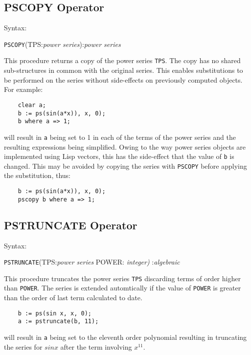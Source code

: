 \subsection{PSCOPY Operator}

Syntax:

\hspace*{2em} {\tt PSCOPY}(TPS:{\em power series}):{\em power series}

This procedure returns a copy of the power series {\tt TPS}. The copy
has no shared sub-structures in common with the original series.  This
enables substitutions to be performed on the series without
side-effects on previously computed objects. For example:

\begin{verbatim}
    clear a;
    b := ps(sin(a*x)), x, 0);
    b where a => 1;
\end{verbatim}

will result in {\tt a} being set to 1 in each of the terms of the
power series and the resulting expressions being simplified. Owing to
the way power series objects are implemented using Lisp vectors, this
has the side-effect that the value of {\tt b} is changed.  This may be
avoided by copying the series with {\tt PSCOPY} before applying the
substitution, thus:

\begin{verbatim}
    b := ps(sin(a*x)), x, 0);
    pscopy b where a => 1;
\end{verbatim}

\subsection{PSTRUNCATE Operator}

Syntax:

\hspace*{2em} {\tt PSTRUNCATE}(TPS:{\em power series} POWER: {\em integer)}
:{\em algebraic}

This procedure truncates the power series {\tt TPS} discarding terms
of order higher than {\tt POWER}. The series is extended automtically
if the value of {\tt POWER} is greater than the order of last term
calculated to date.

\begin{verbatim}
    b := ps(sin x, x, 0);
    a := pstruncate(b, 11);
\end{verbatim}

will result in {\tt a} being set to the eleventh order polynomial
resulting in truncating the series for $sin x$ after the term
involving $x^{11}$. 

